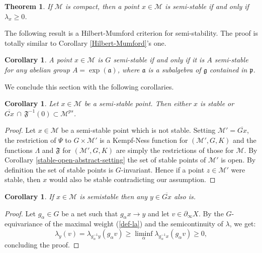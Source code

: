 \documentclass[leqno,11pt, a4]{amsart}
\newtheorem{teo}[equation]{Theorem}
\newtheorem{cor}[equation]{Corollary}
\theoremstyle{named}
\begin{document}
\begin{teo}\label{semi-stable-abstract}
  If ${\mathscr{M}} $ is compact, then a point $x \in {\mathscr{M}}$ is semi-stable if
  and only if ${\lambda}_x \geq 0$.
\end{teo}
The following result is a
Hilbert-Mumford criterion for semi-stability. The proof is totally similar to Corollary \ref{Hilbert-Mumford}'s one.
\begin{cor}\label{Hilbert-Mumfords}
A point $x \in {\mathscr{M}}$ is $G$ semi-stable if and only if it is
$A$ semi-stable for any  abelian group $A=\exp ({\mathfrak{a}})$, where ${\mathfrak{a}}$ is a subalgebra of ${\mathfrak{g}}$ contained in ${\mathfrak{p}}$.
\end{cor}
We conclude this section with the following {corollaries}.
\begin{cor}
Let $x\in {\mathscr{M}}$ be a semi-stable point. Then either $x$ is stable or  $\overline{G x}\,\cap\, {\mathfrak{F}}^{-1}(0)\subset {\mathscr{M}}^{ps}$.
\end{cor}
\begin{proof}
Let $x\in {\mathscr{M}}$ be a semi-stable point which is not stable. Setting ${\mathscr{M}}'=\overline{G x}$, the
restriction of $\Psi $ to $G\times {\mathscr{M}}'$ is a Kempf-Ness function
for $({\mathscr{M}}', G, K)$ and the functions $\Lambda$ and ${\mathfrak{F}}$ for
$({\mathscr{M}}', G, K)$ are simply the restrictions of those for ${\mathscr{M}}$. By Corollary \ref{stable-open-abstract-setting} the set of stable points of ${\mathscr{M}}'$ is open. By definition the set of stable points  is $G$-invariant. Hence if a point $z\in{\mathscr{M}}'$
were stable, then $x$ would also be stable contradicting our assumption.
\end{proof}
\begin{cor}
If $x\in {\mathscr{M}}$ is semistable then any $y\in \overline{G x}$ also is.
\end{cor}
\begin{proof}
Let $g_{\alpha} \in G$ be a net such that $g_{\alpha}  x \rightarrow y$ and let $v\in {\partial_\infty X}$. By the $G$-equivariance of the maximal weight (\ref{def-la}) and the semicontinuity of ${\lambda}$, we get:
\[
\lambda_y (v)=\lambda_{g_{\alpha}^{-1}y}(g_{\alpha} v)\geq \liminf_{\alpha }\lambda_{g_{\alpha}^{-1} x} (g_{\alpha} v)\geq 0,
\]
concluding the proof.
\end{proof}
\end{document}
